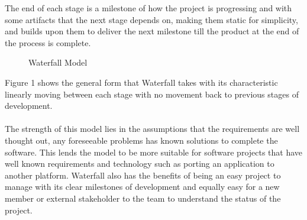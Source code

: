 \documentclass{style/CRPITStyle}
\begin{document}
The end of each stage is a milestone of how the project is progressing and with some artifacts
that the next stage depends on, making them static for simplicity, and builds upon
them to deliver the next milestone till the product at the end of the process is
complete.

\vspace{.1in}

\begin{figure}[htb]
\caption{\protect\label{waterfall}  Waterfall Model}
\end{figure}

\vspace{.1in}

Figure 1 shows the general form that Waterfall takes with its characteristic 
linearly moving between each stage with no movement back to previous stages of
development.

\paragraph{}

The strength of this model lies in the assumptions that the requirements are
well thought out, any foreseeable problems has known solutions to complete the
software.
This lends the model to be more suitable for software projects that have well known
requirements and technology such as porting an application to another platform.
Waterfall also has the benefits of being an easy project to manage with its
clear milestones of development and equally easy for a new member or external
stakeholder to the team to understand the status of the project.

\paragraph{}
\end{document}
